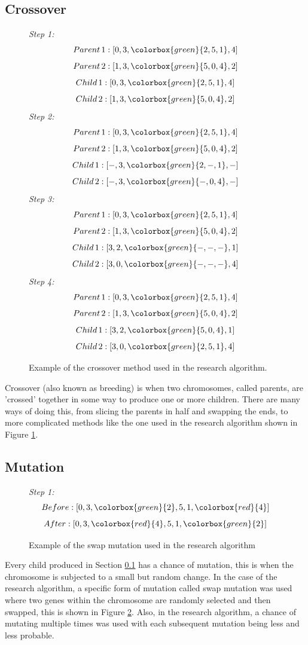 \subsection{Crossover}\label{crossover}
\par
\begin{figure}[h]
\textit{Step 1:}
\[Parent\, 1: [0,3,\colorbox{green}{2,5,1},4]\]
\[Parent\, 2: [1,3,\colorbox{green}{5,0,4},2]\]
\[Child\, 1: [0,3,\colorbox{green}{2,5,1},4]\]
\[Child\, 2: [1,3,\colorbox{green}{5,0,4},2]\]
\textit{Step 2:}
\[Parent\, 1: [0,3,\colorbox{green}{2,5,1},4]\]
\[Parent\, 2: [1,3,\colorbox{green}{5,0,4},2]\]
\[Child\, 1: [-,3,\colorbox{green}{2,-,1},-]\]
\[Child\, 2: [-,3,\colorbox{green}{-,0,4},-]\]
\textit{Step 3:}
\[Parent\, 1: [0,3,\colorbox{green}{2,5,1},4]\]
\[Parent\, 2: [1,3,\colorbox{green}{5,0,4},2]\]
\[Child\, 1: [3,2,\colorbox{green}{-,-,-},1]\]
\[Child\, 2: [3,0,\colorbox{green}{-,-,-},4]\]
\textit{Step 4:}
\[Parent\, 1: [0,3,\colorbox{green}{2,5,1},4]\]
\[Parent\, 2: [1,3,\colorbox{green}{5,0,4},2]\]
\[Child\, 1: [3,2,\colorbox{green}{5,0,4},1]\]
\[Child\, 2: [3,0,\colorbox{green}{2,5,1},4]\]
\caption{Example of the crossover method used in the research algorithm. \label{fig:cross}}
\end{figure}
Crossover (also known as breeding) is when two chromosomes, called parents, are 'crossed' together in some way to produce one or more children. There are many ways of doing this, from slicing the parents in half and swapping the ends, to more complicated methods like the one used in the research algorithm shown in Figure \ref{fig:cross}.
\subsection{Mutation}
\par
\begin{figure}[h]
\textit{Step 1:}
\[Before: [0,3,\colorbox{green}{2},5,1,\colorbox{red}{4}]\]
\[After: [0,3,\colorbox{red}{4},5,1,\colorbox{green}{2}]\]
\caption{Example of the swap mutation used in the research algorithm \label{fig:mut}}
\end{figure}
Every child produced in Section \ref{crossover} has a chance of mutation, this is when the chromosome is subjected to a small but random change. In the case of the research algorithm, a specific form of mutation called swap mutation was used where two genes within the chromosome are randomly selected and then swapped, this is shown in Figure \ref{fig:mut}. Also, in the research algorithm, a chance of mutating multiple times was used with each subsequent mutation being less and less probable.

